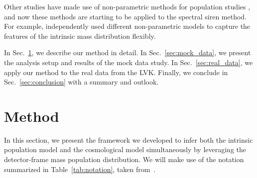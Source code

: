\documentclass[sn-aps, pdflatex, iicol]{sn-jnl}
\begin{document}
Other studies have made use of non-parametric methods for population studies \citep[e.g.,][]{Mandel:2016prl, Mandel:2018mve, Tiwari:2020vym, Rinaldi:2021bhm, Edelman:2021zkw, Sadiq:2021fin, Edelman:2022ydv, Callister:2023tgi, Ray:2023upk, Li:2023yyt, Farah:2024xub, MaganaHernandez:2024uty}, and now these methods are starting to be applied to the spectral siren method.
For example, \cite{Farah:2024xub, MaganaHernandez:2024uty, Li:2024rmi} independently used different non-parametric models to capture the features of the intrinsic mass distribution flexibly.

In Sec.~\ref{sec:method}, we describe our method in detail.
In Sec.~\ref{sec:mock_data}, we present the analysis setup and results of the mock data study.
In Sec.~\ref{sec:real_data}, we apply our method to the real data from the \ac{LVK}.
Finally, we conclude in Sec.~\ref{sec:conclusion} with a summary and outlook.

\section{Method}
\label{sec:method}

In this section, we present the framework we developed to infer both the intrinsic population model and the cosmological model simultaneously by leveraging the detector-frame mass population distribution.
We will make use of the notation summarized in Table~\ref{tab:notation}, taken from~\cite{Rinaldi:2021bhm, Rinaldi:2022kyg}.
\end{document}
